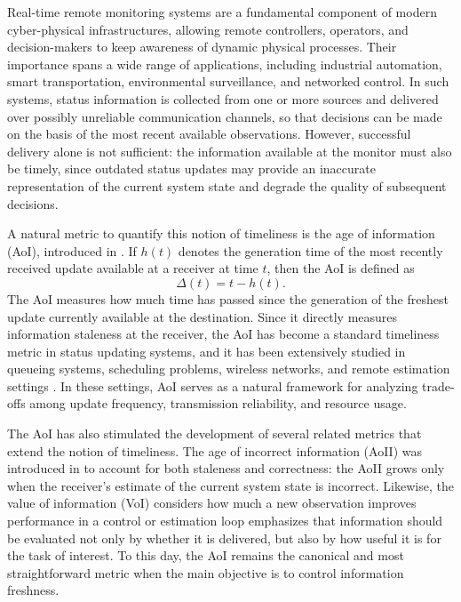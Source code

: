 \documentclass[letterpaper,journal]{IEEEtran}
\begin{document}
Real-time remote monitoring systems are a fundamental component of modern cyber-physical infrastructures, allowing remote controllers, operators, and decision-makers to keep awareness of dynamic physical processes. Their importance spans a wide range of applications, including industrial automation, smart transportation, environmental surveillance, and networked control. In such systems, status information is collected from one or more sources and delivered over possibly unreliable communication channels, so that decisions can be made on the basis of the most recent available observations. However, successful delivery alone is not sufficient: the information available at the monitor must also be timely, since outdated status updates may provide an inaccurate representation of the current system state and degrade the quality of subsequent decisions.

A natural metric to quantify this notion of timeliness is the age of information (AoI), introduced in \cite{kaul2012realtime}. If $h(t)$ denotes the generation time of the most recently received update available at a receiver at time $t$, then the AoI is defined as
\[
\Delta(t)=t-h(t).
\]
The AoI measures how much time has passed since the generation of the freshest update currently available at the destination. Since it directly measures information staleness at the receiver, the AoI has become a standard timeliness metric in status updating systems, and it has been extensively studied in queueing systems, scheduling problems, wireless networks, and remote estimation settings \cite{yates2021aoi,sun2017update,kriouile2022whittle}. In these settings, AoI serves as a natural framework for analyzing trade-offs among update frequency, transmission reliability, and resource usage.

The AoI has also stimulated the development of several related metrics that extend the notion of timeliness. The age of incorrect information (AoII) was introduced in \cite{maatouk2023aoii} to account for both staleness and correctness: the AoII grows only when the receiver's estimate of the current system state is incorrect. Likewise, the value of information (VoI) considers how much a new observation improves performance in a control or estimation loop \cite{soleymani2022voi_quant,soleymani2023voi_global}  emphasizes that information should be evaluated not only by whether it is delivered, but also by how useful it is for the task of interest. To this day, the AoI remains the canonical and most straightforward metric when the main objective is to control information freshness.
\end{document}
